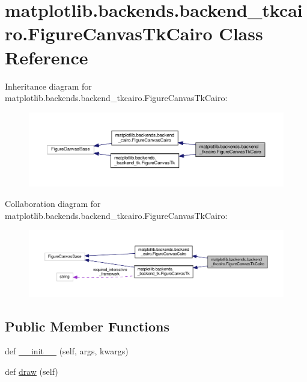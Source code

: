 \hypertarget{classmatplotlib_1_1backends_1_1backend__tkcairo_1_1FigureCanvasTkCairo}{}\section{matplotlib.\+backends.\+backend\+\_\+tkcairo.\+Figure\+Canvas\+Tk\+Cairo Class Reference}
\label{classmatplotlib_1_1backends_1_1backend__tkcairo_1_1FigureCanvasTkCairo}


Inheritance diagram for matplotlib.\+backends.\+backend\+\_\+tkcairo.\+Figure\+Canvas\+Tk\+Cairo\+:
\nopagebreak
\begin{figure}[H]
\begin{center}
\leavevmode
\includegraphics[width=350pt]{classmatplotlib_1_1backends_1_1backend__tkcairo_1_1FigureCanvasTkCairo__inherit__graph}
\end{center}
\end{figure}


Collaboration diagram for matplotlib.\+backends.\+backend\+\_\+tkcairo.\+Figure\+Canvas\+Tk\+Cairo\+:
\nopagebreak
\begin{figure}[H]
\begin{center}
\leavevmode
\includegraphics[width=350pt]{classmatplotlib_1_1backends_1_1backend__tkcairo_1_1FigureCanvasTkCairo__coll__graph}
\end{center}
\end{figure}
\subsection*{Public Member Functions}
\begin{DoxyCompactItemize}
\item 
def \hyperlink{classmatplotlib_1_1backends_1_1backend__tkcairo_1_1FigureCanvasTkCairo_a43f9bbd1204905d727eb3b4f4a037b10}{\+\_\+\+\_\+init\+\_\+\+\_\+} (self, args, kwargs)
\item 
def \hyperlink{classmatplotlib_1_1backends_1_1backend__tkcairo_1_1FigureCanvasTkCairo_afa6f5ce26a8d838758ec6ab3ab7b6d7b}{draw} (self)
\end{DoxyCompactItemize}
